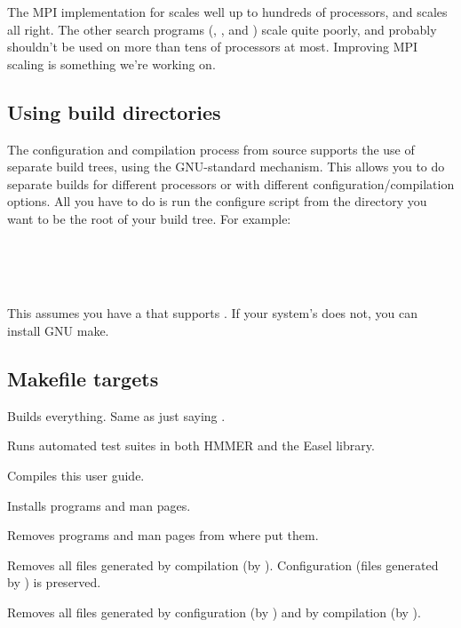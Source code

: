 The MPI implementation for  scales well up to hundreds
of processors, and  scales all right. The other search
programs (, , and ) scale
quite poorly, and probably shouldn't be used on more than tens of
processors at most. Improving MPI scaling is something we're working on.


\subsection{Using build directories}

The configuration and compilation process from source supports the use
of separate build trees, using the GNU-standard 
mechanism. This allows you to do separate builds for different
processors or with different configuration/compilation options. All
you have to do is run the configure script from the directory you want
to be the root of your build tree.  For example:

  \vspace{1ex}
  \\
  \\
  \\
  \vspace{1ex}

This assumes you have a  that supports . If your
system's  does not, you can install GNU make.


\subsection{Makefile targets}

\begin{sreitems}{}

\item[\monob{all}]
  Builds everything. Same as just saying .

\item[\monob{check}]
  Runs automated test suites in both HMMER and the Easel library.

\item[\monob{pdf}]
  Compiles this user guide.

\item[\monob{install}]
  Installs programs and man pages.

\item[\monob{uninstall}]
  Removes programs and man pages from where  put them.

\item[\monob{clean}] Removes all files generated by compilation (by
  ). Configuration (files generated by )
  is preserved.

\item[\monob{distclean}]
  Removes all files generated by configuration (by )
  and by compilation (by ). 

\end{sreitems}


